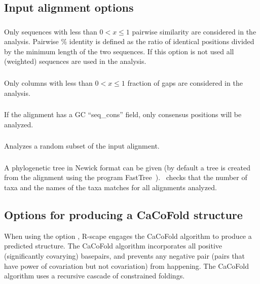 \subsection{Input alignment options}

\subsubsection{} Only sequences with less than $0<x\leq 1$
pairwise similarity are considered in the analysis.  Pairwise \%
identity is defined as the ratio of identical positions divided by the
minimum length of the two sequences. If this option is not used all
(weighted) sequences are used in the analysis.

\subsubsection{} Only columns with less than $0<x\leq 1$ fraction of gaps are considered in the analysis.

\subsubsection{} If the alignment has a GC ``seq\_cons'' field, only consensus positions will be analyzed.

\subsubsection{} Analyzes a random subset of the input alignment.

\subsubsection{} A phylogenetic tree in Newick format can be given (by default a tree is created 
from the alignment using the program FastTree~\citep{Price10}).  \rscape\ checks that the  number of taxa and the names
of the taxa matches for all alignments analyzed.


\subsection{Options for producing a CaCoFold structure}

When using the option , R-scape engages the CaCoFold
algorithm to produce a predicted structure. The CaCoFold algorithm
incorporates all positive (significantly covarying) basepairs, and
prevents any negative pair (pairs that have power of covariation but
not covariation) from happening. The CaCoFold algorithm uses a
recursive cascade of constrained foldings.

